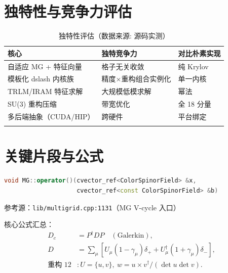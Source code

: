 \documentclass[UTF8]{ctexart}
\begin{document}
\section{独特性与竞争力评估}
\begin{xltabular}{\textwidth}{lXX}
\toprule
\textcolor{algo}{核心} & 独特竞争力 & 对比朴素实现 \\
\midrule
\endhead
自适应 MG + 特征向量 & 格子无关收敛 & 纯 Krylov \\
模板化 dslash 内核族 & 精度×重构组合实例化 & 单一内核 \\
TRLM/IRAM 特征求解 & 大规模低模求解 & 幂法 \\
SU(3) 重构压缩 & 带宽优化 & 全 18 分量 \\
多后端抽象（CUDA/HIP）& 跨硬件 & 平台绑定 \\
\bottomrule
\caption{独特性评估（数据来源: 源码实测）}
\end{xltabular}

\section{关键片段与公式}
\begin{lstlisting}[language=C++]
void MG::operator()(cvector_ref<ColorSpinorField> &x,
                    cvector_ref<const ColorSpinorField> &b)
\end{lstlisting}
参考源：\texttt{lib/multigrid.cpp:1131}（MG V-cycle 入口）

核心公式汇总：
\begin{align}
D_c &= P^\dagger D P \quad(\text{Galerkin}), \label{eq:q1}\\
D &= \sum_\mu\left[U_\mu(1-\gamma_\mu)\delta_{+} + U_\mu^\dagger(1+\gamma_\mu)\delta_{-}\right], \label{eq:q2}\\
\text{重构 12} &: U = \{u,v\},\ w = u\times v^{\dagger}/(\det u \det v). \label{eq:q3}
\end{align}
\end{document}
